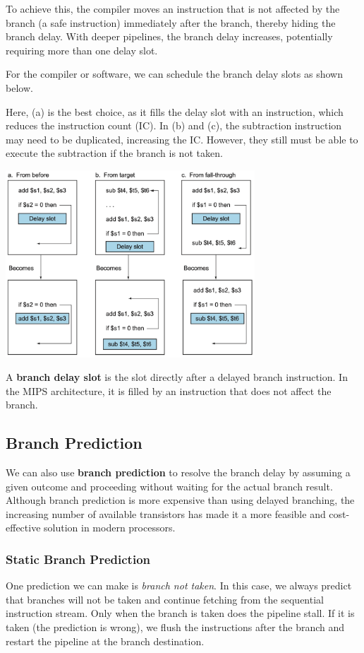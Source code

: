 To achieve this, the compiler moves an instruction that is not affected by the branch (a safe instruction) immediately after the branch, thereby hiding the branch delay. With deeper pipelines, the branch delay increases, potentially requiring more than one delay slot.

For the compiler or software, we can schedule the branch delay slots as shown below.

Here, (a) is the best choice, as it fills the delay slot with an instruction, which reduces the instruction count (IC). In (b) and (c), the subtraction instruction may need to be duplicated, increasing the IC. However, they still must be able to execute the subtraction if the branch is not taken.

\begin{center}
  \includegraphics[width=0.7\textwidth]{Figure/branch_delay_schedule.png}
\end{center}

\begin{remark}
  A \textbf{branch delay slot} is the slot directly after a delayed branch instruction. In the MIPS architecture, it is filled by an instruction that does not affect the branch.
\end{remark}

\subsection{Branch Prediction}
We can also use \textbf{branch prediction} to resolve the branch delay by assuming a given outcome and proceeding without waiting for the actual branch result. Although branch prediction is more expensive than using delayed branching, the increasing number of available transistors has made it a more feasible and cost-effective solution in modern processors.

\subsubsection*{Static Branch Prediction}
One prediction we can make is \textit{branch not taken}. In this case, we always predict that branches will not be taken and continue fetching from the sequential instruction stream. Only when the branch is taken does the pipeline stall. If it is taken (the prediction is wrong), we flush the instructions after the branch and restart the pipeline at the branch destination.

